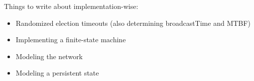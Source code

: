 \documentclass[../main.tex]{subfiles}
\begin{document}
Things to write about implementation-wise:
\begin{itemize}
    \item Randomized election timeouts (also determining broadcastTime and MTBF)
    \item Implementing a finite-state machine
    \item Modeling the network
    \item Modeling a persistent state
\end{itemize}
\end{document}

